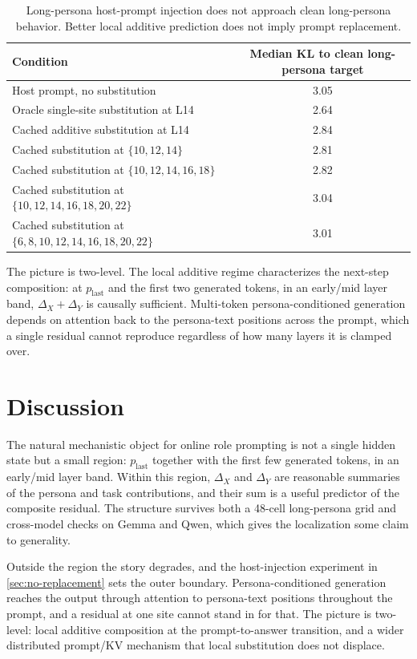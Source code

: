 \documentclass[11pt]{article}
\begin{document}
\begin{table}[t]
\centering
\small
\begin{tabular}{lc}
\toprule
Condition & Median KL to clean long-persona target \\
\midrule
Host prompt, no substitution & 3.05 \\
Oracle single-site substitution at L14 & 2.64 \\
Cached additive substitution at L14 & 2.84 \\
Cached substitution at $\{10,12,14\}$ & 2.81 \\
Cached substitution at $\{10,12,14,16,18\}$ & 2.82 \\
Cached substitution at $\{10,12,14,16,18,20,22\}$ & 3.04 \\
Cached substitution at $\{6,8,10,12,14,16,18,20,22\}$ & 3.01 \\
\bottomrule
\end{tabular}
\caption{Long-persona host-prompt injection does not approach clean long-persona behavior. Better local additive prediction does not imply prompt replacement.}
\label{tab:host-inject}
\end{table}

The picture is two-level. The local additive regime characterizes the next-step composition: at $p_{\text{last}}$ and the first two generated tokens, in an early/mid layer band, $\Delta_X + \Delta_Y$ is causally sufficient. Multi-token persona-conditioned generation depends on attention back to the persona-text positions across the prompt, which a single residual cannot reproduce regardless of how many layers it is clamped over.

\section{Discussion}

The natural mechanistic object for online role prompting is not a single hidden state but a small region: $p_{\text{last}}$ together with the first few generated tokens, in an early/mid layer band. Within this region, $\Delta_X$ and $\Delta_Y$ are reasonable summaries of the persona and task contributions, and their sum is a useful predictor of the composite residual. The structure survives both a 48-cell long-persona grid and cross-model checks on Gemma and Qwen, which gives the localization some claim to generality.

Outside the region the story degrades, and the host-injection experiment in \cref{sec:no-replacement} sets the outer boundary. Persona-conditioned generation reaches the output through attention to persona-text positions throughout the prompt, and a residual at one site cannot stand in for that. The picture is two-level: local additive composition at the prompt-to-answer transition, and a wider distributed prompt/KV mechanism that local substitution does not displace.
\end{document}
